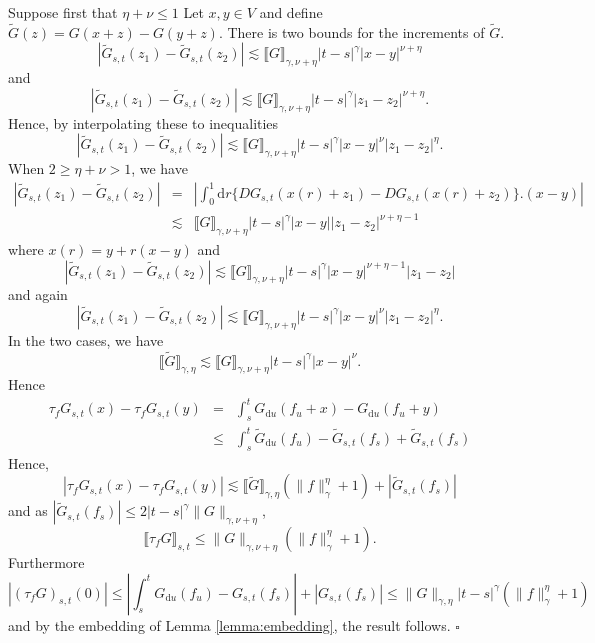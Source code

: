 \documentclass[a4paper,11pt]{article}
\newcommand{\mathd}{\mathrm{d}}
\newenvironment{proof}{{\sc Proof.}}{\hfill$\square$}
\begin{document}
\begin{proof}
  Suppose first that $\eta + \nu \leqslant 1$ Let $x,y \in V$ and define
  $\tilde{G} ( z ) =G ( x+z ) -G ( y+z )$. There is two bounds for the
  increments of $\tilde{G}$.
  \[ | \tilde{G}_{s,t} ( z_{1} ) - \tilde{G}_{s,t} ( z_{2} ) | \lesssim
     \llbracket G \rrbracket_{\gamma , \nu + \eta} | t-s |^{\gamma} | x-y
     |^{\nu + \eta} \]
  and
  \[ | \tilde{G}_{s,t} ( z_{1} ) - \tilde{G}_{s,t} ( z_{2} ) | \lesssim
     \llbracket G \rrbracket_{\gamma , \nu + \eta} | t-s |^{\gamma} | z_{1}
     -z_{2} |^{\nu + \eta} . \]
  Hence, by interpolating these to inequalities
  \[ | \tilde{G}_{s,t} ( z_{1} ) - \tilde{G}_{s,t} ( z_{2} ) | \lesssim
     \llbracket G \rrbracket_{\gamma , \nu + \eta} | t-s |^{\gamma} | x-y
     |^{\nu} | z_{1} -z_{2} |^{\eta} . \]
  When $2 \geqslant \eta + \nu >1$, we have
  \begin{eqnarray*}
    | \tilde{G}_{s,t} ( z_{1} ) - \tilde{G}_{s,t} ( z_{2} ) | & = & \left\lvert
    \int_{0}^{1} \mathd r  \{ D G_{s,t} ( x(r) +z_{1}  ) -D G_{s,t} ( x(r) +z_{2} ) \} .(x-y) \right\lvert\\
    & \lesssim & \llbracket G \rrbracket_{\gamma , \nu + \eta} | t-s
    |^{\gamma} | x-y | | z_{1} -z_{2} |^{\nu + \eta -1}
  \end{eqnarray*}
  where $x(r) = y+r(x-y)$
  and
  \[ | \tilde{G}_{s,t} ( z_{1} ) - \tilde{G}_{s,t} ( z_{2} ) | \lesssim
     \llbracket G \rrbracket_{\gamma , \nu + \eta} | t-s |^{\gamma} | x-y
     |^{\nu + \eta -1} | z_{1} -z_{2} | \]
  and again
  \[ | \tilde{G}_{s,t} ( z_{1} ) - \tilde{G}_{s,t} ( z_{2} ) | \lesssim
     \llbracket G \rrbracket_{\gamma , \nu + \eta} | t-s |^{\gamma} | x-y
     |^{\nu} | z_{1} -z_{2} |^{\eta} . \]
  In the two cases, we have
  \[ \llbracket \tilde{G} \rrbracket_{\gamma , \eta} \lesssim \llbracket G
     \rrbracket_{\gamma , \nu + \eta} | t-s |^{\gamma} | x-y |^{\nu} . \]
  Hence
  \begin{eqnarray*}
    \tau_{f} G_{s,t} ( x ) - \tau_{f} G_{s,t} ( y ) & = & \int_{s}^{t}
    G_{\mathd u} ( f_{u} +x ) -G_{\mathd u} ( f_{u} +y )\\
    & \leqslant & \int_{s}^{t} \tilde{G}_{\mathd u} ( f_{u} ) -
    \tilde{G}_{s,t} ( f_{s} ) + \tilde{G}_{s,t} ( f_{s} )
  \end{eqnarray*}
  Hence,
  \[ | \tau_{f} G_{s,t} ( x ) - \tau_{f} G_{s,t} ( y ) | \lesssim \llbracket
     \tilde{G} \rrbracket_{\gamma , \eta} ( \| f \|^{\eta}_{\gamma} +1 ) + |
     \tilde{G}_{s,t} ( f_{s} ) | \]
  and as $| \tilde{G}_{s,t} ( f_{s} ) | \leqslant 2 | t-s |^{\gamma} \| G
  \|_{\gamma , \nu + \eta}$,
  \[ \llbracket \tau_{f} G \rrbracket_{s,t} \leqslant \| G \|_{\gamma , \nu +
     \eta} ( \| f \|^{\eta}_{\gamma} +1 ) . \]
  Furthermore
  \[ | ( \tau_{f} G )_{s,t} ( 0 ) | \leqslant \left\lvert \int_{s}^{t} G_{\mathd u}
     ( f_{u} ) -G_{s,t} ( f_{s} ) \right\lvert + | G_{s,t} ( f_{s} ) | \leqslant \|
     G \|_{\gamma , \eta} | t-s |^{\gamma} ( \| f \|_{\gamma}^{\eta} +1 ) \]
  and by the embedding of Lemma \ref{lemma:embedding}, the result follows.
\end{proof}
\end{document}
